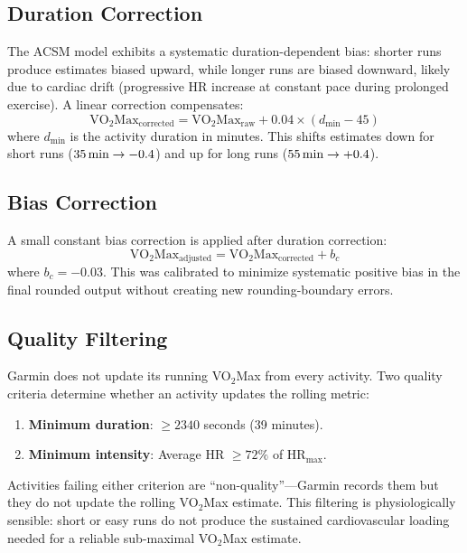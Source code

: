 \documentclass[11pt,a4paper]{article}
\begin{document}
\subsection{Duration Correction}
\label{sec:duration-correction}

The ACSM model exhibits a systematic duration-dependent bias: shorter runs produce estimates biased upward, while longer runs are biased downward, likely due to cardiac drift (progressive HR increase at constant pace during prolonged exercise).
A linear correction compensates:
\begin{equation}
\text{VO}_2\text{Max}_{\text{corrected}} = \text{VO}_2\text{Max}_{\text{raw}} + 0.04 \times (d_{\text{min}} - 45)
\label{eq:dur-correction}
\end{equation}
where $d_{\text{min}}$ is the activity duration in minutes.
This shifts estimates down for short runs ($35\text{\,min} \to -0.4$) and up for long runs ($55\text{\,min} \to +0.4$).


\subsection{Bias Correction}
\label{sec:bias-correction}

A small constant bias correction is applied after duration correction:
\begin{equation}
\text{VO}_2\text{Max}_{\text{adjusted}} = \text{VO}_2\text{Max}_{\text{corrected}} + b_c
\label{eq:bias-correction}
\end{equation}
where $b_c = -0.03$.
This was calibrated to minimize systematic positive bias in the final rounded output without creating new rounding-boundary errors.


\subsection{Quality Filtering}
\label{sec:quality}

Garmin does not update its running VO$_2$Max from every activity.
Two quality criteria determine whether an activity updates the rolling metric:
\begin{enumerate}[nosep]
    \item \textbf{Minimum duration}: $\geq 2340$ seconds (39 minutes).
    \item \textbf{Minimum intensity}: Average HR $\geq 72\%$ of HR$_{\text{max}}$.
\end{enumerate}

Activities failing either criterion are ``non-quality''---Garmin records them but they do not update the rolling VO$_2$Max estimate.
This filtering is physiologically sensible: short or easy runs do not produce the sustained cardiovascular loading needed for a reliable sub-maximal VO$_2$Max estimate.
\end{document}
